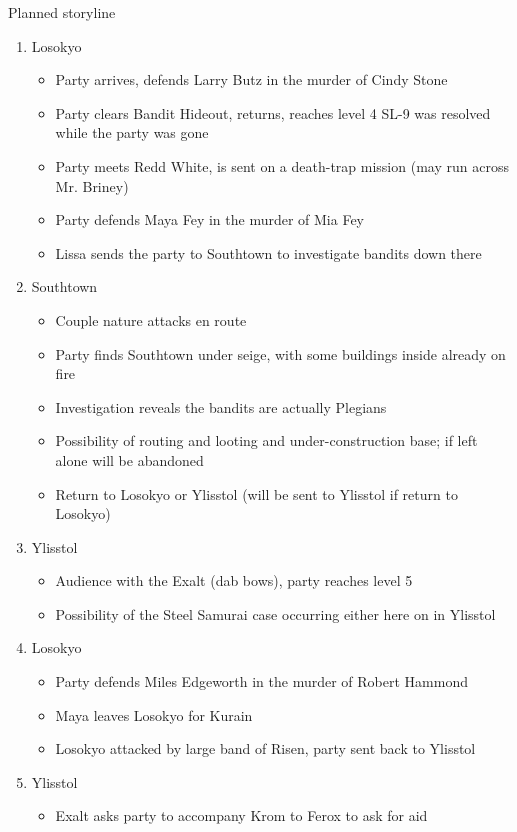 \documentclass[11pt]{article} %
\begin{document}
Planned storyline
\begin{enumerate}
\item Losokyo
\begin{itemize}
\item Party arrives, defends Larry Butz in the murder of Cindy Stone
\item Party clears Bandit Hideout, returns, reaches level 4
SL-9 was resolved while the party was gone
\item Party meets Redd White, is sent on a death-trap mission (may run across Mr. Briney)
\item Party defends Maya Fey in the murder of Mia Fey
\item Lissa sends the party to Southtown to investigate bandits down there
\end{itemize}
\item Southtown
\begin{itemize}
\item Couple nature attacks en route
\item Party finds Southtown under seige, with some buildings inside already on fire
\item Investigation reveals the bandits are actually Plegians
\item Possibility of routing and looting and under-construction base; if left alone will be abandoned
\item Return to Losokyo or Ylisstol (will be sent to Ylisstol if return to Losokyo)
\end{itemize}
\item Ylisstol
\begin{itemize}
\item Audience with the Exalt (dab bows), party reaches level 5
\item Possibility of the Steel Samurai case occurring either here on in Ylisstol
\end{itemize}
\item Losokyo
\begin{itemize}
\item Party defends Miles Edgeworth in the murder of Robert Hammond
\item Maya leaves Losokyo for Kurain
\item Losokyo attacked by large band of Risen, party sent back to Ylisstol
\end{itemize}
\item Ylisstol
\begin{itemize}
\item Exalt asks party to accompany Krom to Ferox to ask for aid

\end{itemize}
\end{enumerate}
\end{document}
